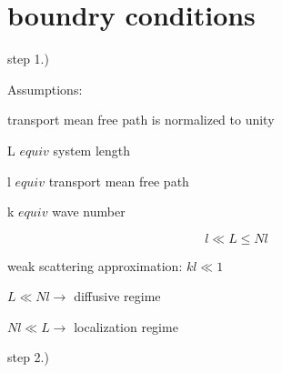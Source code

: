 
\section {boundry conditions}

step 1.) 

Assumptions:

transport mean free path is normalized to unity

L $equiv$ system length

l $equiv$ transport mean free path

k $equiv$ wave number

\begin{equation}
l \ll L \leq N l
\end{equation}

weak scattering approximation: $k l \ll 1$

$L \ll N l \rightarrow$ diffusive regime

$N l \ll L \rightarrow$ localization regime


step 2.) 

